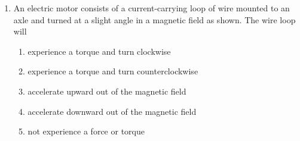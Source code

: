 \documentclass{../../../oss-classkick}
\begin{document}
\begin{multicols}{2}
\begin{enumerate}[leftmargin=18pt,resume]
  \item An electric motor consists of a current-carrying loop of wire mounted
    to an axle and turned at a slight angle in a magnetic field as shown. The
    wire loop will
    \begin{center}
    \end{center}
    \begin{enumerate}[nosep,leftmargin=18pt,label=(\Alph*)]
    \item experience a torque and turn clockwise
    \item experience a torque and turn counterclockwise
    \item accelerate upward out of the magnetic field
    \item accelerate downward out of the magnetic field
    \item not experience a force or torque
    \end{enumerate}

    
  \end{enumerate}
\end{multicols}
\newpage


\genfreedirections
\end{document}
